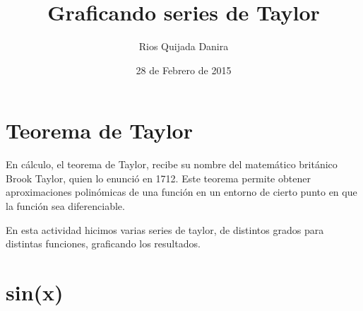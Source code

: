 \documentclass[10pt]{article}
\title{Graficando series de Taylor}
\author{Rios Quijada Danira}
\date{28 de Febrero de 2015}
\begin{document}
\maketitle
\section{Teorema de Taylor}
En cálculo, el teorema de Taylor, recibe su nombre del matemático británico Brook Taylor, quien lo enunció en 1712. Este teorema permite obtener aproximaciones polinómicas de una función en un entorno de cierto punto en que la función sea diferenciable.

En esta actividad hicimos varias series de taylor, de distintos grados para distintas funciones, graficando los resultados. 

\section{sin(x)} 
\end{document}
